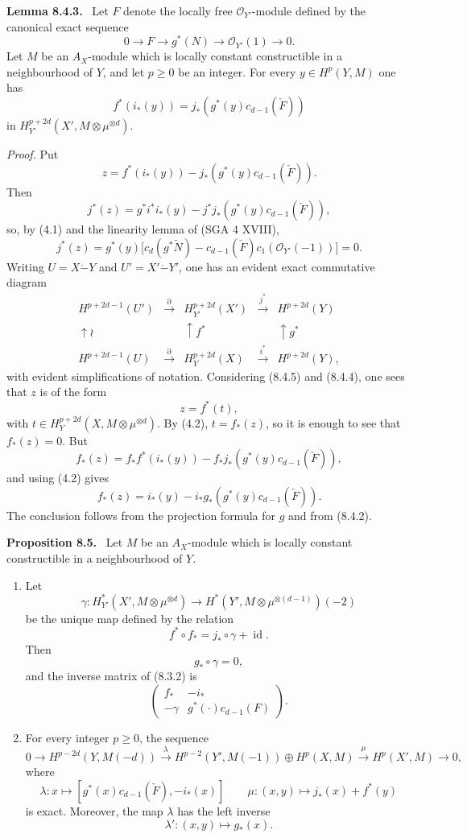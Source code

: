 \documentclass[11pt]{article}
\newenvironment{statement}[1]{\par\medskip\noindent\textbf{#1.}\ }{\par\medskip}
\begin{document}
\begin{statement}{Lemma 8.4.3}
Let $F$ denote the locally free $\mathcal O_{Y'}$-module defined by the canonical exact sequence
\[
0\to F\to g^*(N)\to\mathcal O_{Y'}(1)\to0.
\]
Let $M$ be an $A_X$-module which is locally constant constructible in a neighbourhood of $Y$, and let $p\ge0$ be an integer. For every $y\in H^p(Y,M)$ one has
\[
f^*(i_*(y))=j_*(g^*(y)c_{d-1}(\check F))
\]
in $H_{Y'}^{p+2d}(X',M\otimes\mu^{\otimes d})$.
\end{statement}

\emph{Proof.} Put
\[
z=f^*(i_*(y))-j_*(g^*(y)c_{d-1}(\check F)).
\]
Then
\[
j^*(z)=g^*i^*i_*(y)-j^*j_*(g^*(y)c_{d-1}(\check F)),
\]
so, by (4.1) and the linearity lemma of (SGA 4 XVIII),
\[
j^*(z)=g^*(y)\bigl[c_d(g^*\check N)-c_{d-1}(\check F)c_1(\mathcal O_{Y'}(-1))\bigr]=0.
\tag{8.4.4}
\]
Writing $U=X\mathbin{\dot{-}}Y$ and $U'=X'\mathbin{\dot{-}}Y'$, one has an evident exact commutative diagram
\[
\begin{array}{ccccc}
H^{p+2d-1}(U')&\xrightarrow{\partial}&H^{p+2d}_{Y'}(X')&\xrightarrow{j^*}&H^{p+2d}(Y)\\
\uparrow\wr&&\uparrow f^*&&\uparrow g^*\\
H^{p+2d-1}(U)&\xrightarrow{\partial}&H_Y^{p+2d}(X)&\xrightarrow{i^*}&H^{p+2d}(Y),
\end{array}
\tag{8.4.5}
\]
with evident simplifications of notation. Considering (8.4.5) and (8.4.4), one sees that $z$ is of the form
\[
z=f^*(t),
\]
with $t\in H_Y^{p+2d}(X,M\otimes\mu^{\otimes d})$. By (4.2), $t=f_*(z)$, so it is enough to see that $f_*(z)=0$. But
\[
f_*(z)=f_*f^*(i_*(y))-f_*j_*(g^*(y)c_{d-1}(\check F)),
\]
and using (4.2) gives
\[
f_*(z)=i_*(y)-i_*g_*(g^*(y)c_{d-1}(\check F)).
\]
The conclusion follows from the projection formula for $g$ and from (8.4.2).

\begin{statement}{Proposition 8.5}
Let $M$ be an $A_X$-module which is locally constant constructible in a neighbourhood of $Y$.
\begin{enumerate}[label=\alph*)]
\item Let
\[
\gamma:H_{Y'}^*(X',M\otimes\mu^{\otimes d})\to
H^*(Y',M\otimes\mu^{\otimes(d-1)})(-2)
\]
be the unique map defined by the relation
\[
f^*\circ f_* = j_*\circ\gamma+\operatorname{id}.
\tag{8.5.1}
\]
Then
\[
g_*\circ\gamma=0,
\tag{8.5.2}
\]
and the inverse matrix of (8.3.2) is
\[
\begin{pmatrix}
f_*&-i_*\\
-\gamma&g^*(\cdot)c_{d-1}( F)
\end{pmatrix}.
\tag{8.5.3}
\]
\item For every integer $p\ge0$, the sequence
\[
0\to H^{p-2d}(Y,M(-d))
\xrightarrow{\lambda}
H^{p-2}(Y',M(-1))\oplus H^p(X,M)
\xrightarrow{\mu}
H^p(X',M)\to0,
\]
where
\[
\lambda : x\longmapsto [g^*(x)c_{d-1}(\check F),-i_*(x)]
\qquad
\mu : (x,y)\mapsto j_*(x)+f^*(y)
\]
is exact. Moreover, the map $\lambda$ has the left inverse
\[
\lambda' : (x,y)\longmapsto g_*(x).
\]
\end{enumerate}
\end{statement}
\end{document}
